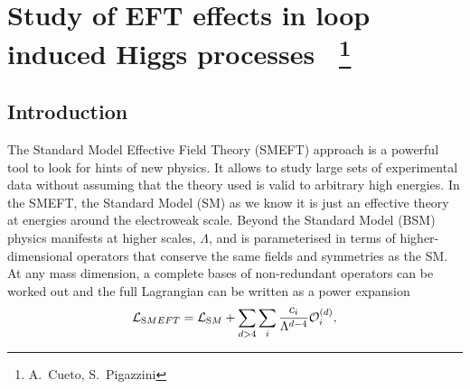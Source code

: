 \newcommand{\cpDC}{\ensuremath{c_{pDC}}\xspace}
\newcommand{\cpG}{\ensuremath{c_{pG}}\xspace}
\newcommand{\cdp}{\ensuremath{c_{dp}}\xspace}
\newcommand{\cpe}{\ensuremath{c_{pe}}\xspace}
\newcommand{\cpl}[1]{\ensuremath{c_{pl#1}}\xspace}
\newcommand{\cpmu}{\ensuremath{c_{pmu}}\xspace}
\newcommand{\cpqi}{\ensuremath{c_{pq3i}}\xspace}
\newcommand{\ctpl}[1]{\ensuremath{c_{3pl#1}}\xspace}
\newcommand{\cpd}{\ensuremath{c_{pd}}\xspace}
\newcommand{\cpQ}{\ensuremath{c_{pQ3}}\xspace}
\newcommand{\cpQM}{\ensuremath{c_{pQM}}\xspace}
\newcommand{\cpqMi}{\ensuremath{c_{pqMi}}\xspace}
\newcommand{\cpt}{\ensuremath{c_{pt}}\xspace}
\newcommand{\cpu}{\ensuremath{c_{pu}}\xspace}
\newcommand{\ctG}{\ensuremath{c_{tG}}\xspace}
\newcommand{\ctp}{\ensuremath{c_{tp}}\xspace}
\newcommand{\cpW}{\ensuremath{c_{pW}}\xspace}
\newcommand{\cpBB}{\ensuremath{c_{pBB}}\xspace}
\newcommand{\cpWB}{\ensuremath{c_{pWB}}\xspace}
\newcommand{\ctB}{\ensuremath{c_{tB}}\xspace}
\newcommand{\ctW}{\ensuremath{c_{tW}}\xspace}
\newcommand{\cll}{\ensuremath{c_{ll}}\xspace}



\section{Study of EFT effects in loop induced Higgs processes ~\protect\footnote{
  A.~Cueto,
  S.~Pigazzini}{}}

\label{sec:projname}



\subsection{Introduction}
\label{sec:higgseft:section1}
The Standard Model Effective Field Theory (SMEFT) approach is a powerful tool to look for hints of new physics. It allows to study large sets of experimental data without assuming that the theory used is valid to arbitrary high energies. In the SMEFT, the Standard Model (SM) as we know it is just an effective theory at energies around the electroweak scale. Beyond the Standard Model (BSM) physics manifests at higher scales, $\Lambda$, and is parameterised in terms of higher-dimensional operators that conserve the same fields and symmetries as the SM. At any mass dimension, a complete bases of non-redundant operators can be worked out and the full Lagrangian can be written as a power expansion
\begin{equation}
\mathcal{L}_{\textrm SMEFT} = \mathcal{L}_{\textrm SM} + \sum_{d>4}\sum_{i}\frac{c_i}{\Lambda^{d-4}}\mathcal{O}_{i}^{(d)},
\end{equation}  

